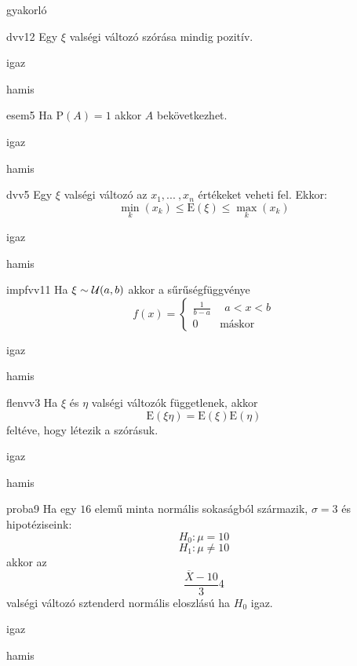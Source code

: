 \documentclass[12pt]{article}
\begin{document}
\begin{quiz}{gyakorló}

\begin{multi}[feedback={Egy konstans v.v-nak 0 a szórása.}]{dvv12}
Egy $\xi$ valségi változó szórása mindig pozitív.
\item igaz
\item* hamis
\end{multi}
\begin{multi}[feedback={Nókoment.}]{esem5}
Ha $\mathrm{P}(A)=1$ akkor $A$ bekövetkezhet.
\item* igaz
\item hamis
\end{multi}
\begin{multi}[feedback={Az adott feltételek mellet a várható érték egy súlyozott közép.}]{dvv5}
Egy $\xi$ valségi változó az $x_1,{...\:}, x_n$ értékeket veheti fel. Ekkor:
$$
\min_k(x_k)\le \mathrm{E}(\xi) \le \max_k(x_k)
$$
\item* igaz
\item hamis
\end{multi}
\begin{multi}[feedback={Def.}]{impfvv11}
Ha $\xi\sim {\cal U}(a,b)$ akkor a sűrűségfüggvénye 
$$
f(x)=
\begin{cases}
\frac{1}{b-a} & \ \ a<x<b \\
0 & \text{máskor} 
\end{cases}
$$
\item* igaz
\item hamis
\end{multi}
\begin{multi}[feedback={Tétel.}]{flenvv3}
Ha $\xi$ és $\eta$ valségi változók függetlenek, akkor
$$
\mathrm{E}(\xi \eta)=\mathrm{E}(\xi)\mathrm{E}(\eta)
$$
feltéve, hogy létezik a szórásuk.
\item* igaz
\item hamis
\end{multi}
\begin{multi}[feedback={Igen, éppen ez alapján tudunk dönteni. Ahhoz képest hogy sztenderd normális átlagos, tipikus értéket, vagy kiugró, extrém értéket látunk.}]{proba9}
Ha egy $16$ elemű minta normális sokaságból származik, $\sigma=3$ és hipotéziseink:
$$
H_0: \mu=10
$$
$$
H_1: \mu\neq 10
$$
akkor az 
$$
\frac{\overline{X}-10}{3}4
$$
valségi változó sztenderd normális eloszlású ha $H_0$ igaz.
\item* igaz
\item hamis
\end{multi}

\end{quiz}
\end{document}
